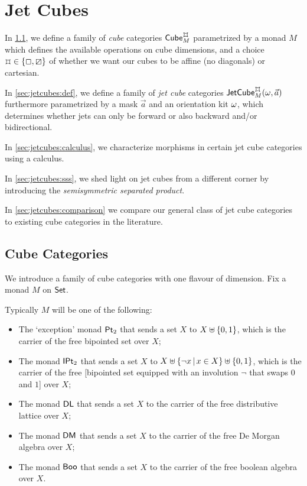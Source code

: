 \documentclass[a4paper]{memoir}
\begin{document}
\section{Jet Cubes} \label{sec:jetcubes}
In \cref{sec:cubes}, we define a family of \emph{cube} categories $\cubecat_M^\mycubex$ parametrized by a monad $M$ which defines the available operations on cube dimensions, and a choice $\mycubex \in \accol{\affine, \cartes}$ of whether we want our cubes to be affine (no diagonals) or cartesian.

In \cref{sec:jetcubes:def}, we define a family of \emph{jet cube} categories $\jetcube{\myorix}{\mycubex}{M}{\vec a}$ furthermore parametrized by a mask $\vec a$ and an orientation kit $\omega$, which determines whether jets can only be forward or also backward and/or bidirectional.

In \cref{sec:jetcubes:calculus}, we characterize morphisms in certain jet cube categories using a calculus.

In \cref{sec:jetcubes:sss}, we shed light on jet cubes from a different corner by introducing the \emph{semisymmetric separated product}.

In \cref{sec:jetcubes:comparison} we compare our general class of jet cube categories to existing cube categories in the literature.

\subsection{Cube Categories} \label{sec:cubes}
We introduce a family of cube categories with one flavour of dimension. Fix a monad $M$ on ${\mathsf{Set}}$.
\begin{example} \label{ex:cube-monads}
	Typically $M$ will be one of the following:
	\begin{itemize}
		\item The `exception' monad ${\mathsf{Pt}_2}$ that sends a set $X$ to $X \uplus \mathopen{}\left\{ 0,1 \right\}\mathclose{}$, which is the carrier of the free bipointed set over $X$;
		\item The monad ${\mathsf{IPt}_2}$ that sends a set $X$ to $X \uplus \mathopen{}\left\{ \lnot x \,\middle|\, x \in X \right\}\mathclose{} \uplus \mathopen{}\left\{ 0, 1 \right\}\mathclose{}$, which is the carrier of the free [bipointed set equipped with an involution $\lnot$ that swaps $0$ and $1$] over $X$;
		\item The monad $\mathsf{DL}$ that sends a set $X$ to the carrier of the free distributive lattice over $X$;
		\item The monad $\mathsf{DM}$ that sends a set $X$ to the carrier of the free De Morgan algebra over $X$;
		\item The monad $\mathsf{Boo}$ that sends a set $X$ to the carrier of the free boolean algebra over $X$.
	\end{itemize}
\end{example}
\end{document}

